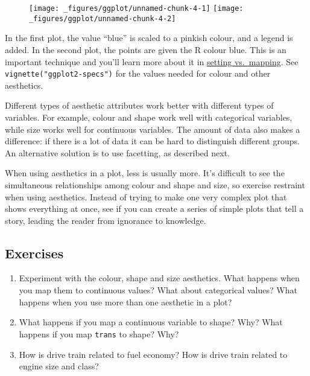 \begin{figure}[H]
  \texttt{[image: \_figures/ggplot/unnamed-chunk-4-1]}%
  \texttt{[image: \_figures/ggplot/unnamed-chunk-4-2]}
\end{figure}

In the first plot, the value ``blue'' is scaled to a pinkish colour, and
a legend is added. In the second plot, the points are given the R colour
blue. This is an important technique and you'll learn more about it in
\hyperref[sub:setting-mapping]{setting vs.~mapping}. See
\texttt{vignette("ggplot2-specs")} for the values needed for colour and
other aesthetics.

Different types of aesthetic attributes work better with different types
of variables. For example, colour and shape work well with categorical
variables, while size works well for continuous variables. The amount of
data also makes a difference: if there is a lot of data it can be hard
to distinguish different groups. An alternative solution is to use
facetting, as described next.

When using aesthetics in a plot, less is usually more. It's difficult to
see the simultaneous relationships among colour and shape and size, so
exercise restraint when using aesthetics. Instead of trying to make one
very complex plot that shows everything at once, see if you can create a
series of simple plots that tell a story, leading the reader from
ignorance to knowledge.

\subsection{Exercises}

\begin{enumerate}
\def\labelenumi{\arabic{enumi}.}
\item
  Experiment with the colour, shape and size aesthetics. What happens
  when you map them to continuous values? What about categorical values?
  What happens when you use more than one aesthetic in a plot?
\item
  What happens if you map a continuous variable to shape? Why? What
  happens if you map \texttt{trans} to shape? Why?
\item
  How is drive train related to fuel economy? How is drive train related
  to engine size and class?
\end{enumerate}



